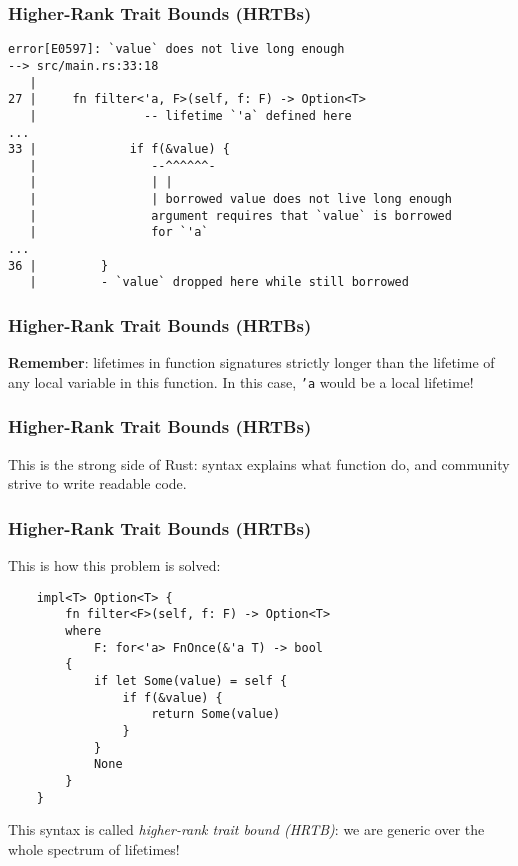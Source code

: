 \documentclass[aspectratio=1610,t]{beamer}
\begin{document}

\begin{frame}[fragile,c]
\frametitle{Higher-Rank Trait Bounds (HRTBs)}
\begin{verbatim}
error[E0597]: `value` does not live long enough
--> src/main.rs:33:18
   |
27 |     fn filter<'a, F>(self, f: F) -> Option<T>
   |               -- lifetime `'a` defined here
...
33 |             if f(&value) {
   |                --^^^^^^-
   |                | |
   |                | borrowed value does not live long enough
   |                argument requires that `value` is borrowed
   |                for `'a`
...
36 |         }
   |         - `value` dropped here while still borrowed
\end{verbatim}
\end{frame}


\begin{frame}[fragile]
\frametitle{Higher-Rank Trait Bounds (HRTBs)}
\textbf{Remember}: lifetimes in function signatures strictly longer than the lifetime of any local variable in this function. In this case, \texttt{'a} would be a local lifetime!

\end{frame}


\begin{frame}[fragile]
\frametitle{Higher-Rank Trait Bounds (HRTBs)}
This is the strong side of Rust: syntax explains what function do, and community strive to write readable code.

\end{frame}


\begin{frame}[fragile,c]
\frametitle{Higher-Rank Trait Bounds (HRTBs)}
This is how this problem is solved:

\begin{verbatim}
    impl<T> Option<T> {
        fn filter<F>(self, f: F) -> Option<T>
        where
            F: for<'a> FnOnce(&'a T) -> bool
        {
            if let Some(value) = self {
                if f(&value) {
                    return Some(value)
                }
            }
            None
        }
    }
\end{verbatim}

This syntax is called \textit{higher-rank trait bound (HRTB)}: we are generic over the whole spectrum of lifetimes!
\end{frame}
\end{document}
